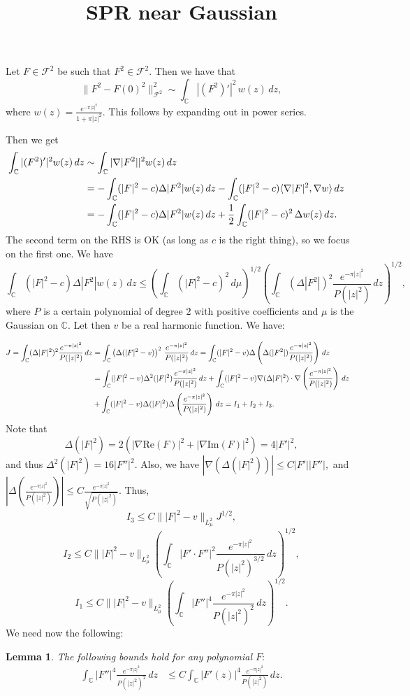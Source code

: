 \documentclass[a4paper,11pt,reqno]{amsart}
\title{SPR near Gaussian}
\numberwithin{equation}{section}
\theoremstyle{plain} %
\newtheorem{lemma}{Lemma}[section]
\theoremstyle{definition} %
\theoremstyle{remark}
\newcommand{\C}{\mathbb{C}}
\begin{document}
\maketitle 

Let $F \in \mathcal{F}^2$ be such that $F^2 \in \mathcal{F}^2$. Then we have that 
\[
\|F^2 - F(0)^2\|_{\mathcal{F}^2}^2 \sim \int_{\C} |(F^2)'|^2 \, w(z) \, dz,
\]
where $w(z) = \frac{e^{-\pi|z|^2}}{1+\pi |z|^2}$. This follows by expanding out in power series. 

Then we get 
\begin{align*}
\int_{\C} |(F^2)'|^2 w(z) \, dz & \sim \int_{\C} |\nabla |F^2||^2 w(z) \, dz \cr 
 & = - \int_{\C} (|F|^2 - c) \Delta |F^2| w(z) \, dz - \int_{\C} (|F|^2 -c) \langle \nabla |F|^2, \nabla w\rangle \, dz \cr 
 & = - \int_{\C} (|F|^2-c)\Delta |F^2| w(z) \, dz + \frac{1}{2} \int_{\C} (|F|^2 - c)^2 \, \Delta w(z) \, dz. 
\end{align*}
The second term on the RHS is OK (as long as $c$ is the right thing), so we focus on the first one. We have 
\[
\int_{\C} (|F|^2 - c)\Delta|F^2| w(z) \, dz \le \left( \int_{\C} (|F|^2 - c)^2 \, d\mu\right)^{1/2} \left( \int_{\C} (\Delta|F^2|)^2 \frac{e^{-\pi|z|^2}}{P(|z|^2)} \, dz\right)^{1/2}, 
\]
where $P$ is a certain polynomial of degree $2$ with positive coefficients and $\mu$ is the Gaussian on $\C$. Let then $v$ be a real harmonic function. We have: 

\begin{align*}
J = \int_{\C} (\Delta|F|^2)^2 \frac{e^{-\pi|z|^2}}{P(|z|^2)} \, dz & = \int_{\C} \left(\Delta(|F|^2 - v)\right)^2 \, \frac{e^{-\pi|z|^2}}{P(|z|^2)} \, d z  = \int_{\C} (|F|^2-v)\Delta \left( \Delta(|F^2|) \frac{e^{-\pi|z|^2}}{P(|z|^2)}  \right) \, d z \cr 
    & = \int_{\C} (|F|^2 - v) \Delta^2(|F|^2) \frac{e^{-\pi|z|^2}}{P(|z|^2)} \, dz + \int_{\C} (|F|^2 -v) \nabla (\Delta |F|^2) \cdot \nabla \left( \frac{e^{-\pi|z|^2}}{P(|z|^2)} \right) \, dz \cr 
    & + \int_{\C} (|F|^2 -v) \Delta(|F|^2) \Delta\left( \frac{e^{-\pi|z|^2}}{P(|z|^2)} \right) \, dz = I_1 + I_2 + I_3.
\end{align*}
Note that 
$$\Delta(|F|^2) = 2 \left(|\nabla \text{Re}(F)|^2 + |\nabla \text{Im}(F)|^2 \right) = 4 |F'|^2,$$
and thus $\Delta^2(|F|^2) = 16 |F''|^2.$ Also, we have $|\nabla (\Delta (|F|^2))| \le C |F'||F''|, $ and $\left| \Delta \left( \frac{e^{-\pi|z|^2}}{P(|z|^2)}\right) \right| \le C \frac{e^{-\pi|z|^2}}{\sqrt{P(|z|^2)}}.$ Thus, 
\[
I_3 \le C \||F|^2 - v\|_{L^2_\mu} J^{1/2},
\]
\[
I_2 \le C \||F|^2 - v\|_{L^2_\mu} \left( \int_{\C} |F' \cdot F''|^2 \frac{e^{-\pi |z|^2}}{P(|z|^2)^{3/2}} \, dz \right)^{1/2},
\]
\[
I_1 \le C  \||F|^2 - v\|_{L^2_\mu} \left( \int_{\C} |F''|^4 \frac{e^{-\pi|z|^2}}{P(|z|^2)^2} \, dz \right)^{1/2}.
\]
We need now the following: 
\begin{lemma} The following bounds hold for any polynomial $F:$
\begin{align*}
\int_{\C} |F''|^4 \frac{e^{-\pi|z|^2}}{P(|z|^2)^2}\, dz & \le C \int_{\C} |F'(z)|^4 \frac{e^{-\pi|z|^2}}{P(|z|^2)} \, dz. 
\end{align*}
\end{lemma} 
\end{document}

